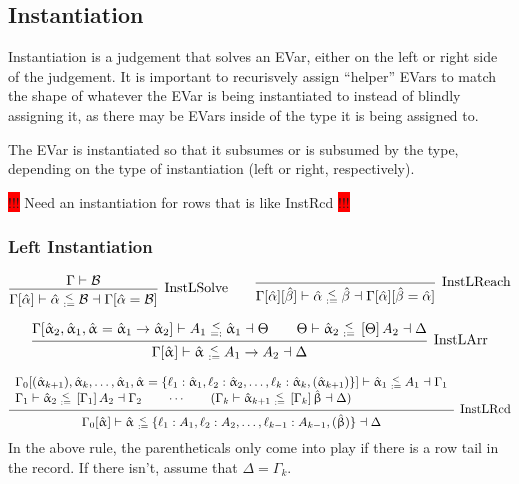 \documentclass{article}
\newcommand{\consider}[1]{\colorbox{red}{!!!} #1 \colorbox{red}{!!!}}
\newcommand{\spc}{\qquad}
\newcommand{\lbl}{\ell}
\newcommand{\ev}{\hat}
\newcommand{\evar}[1][]{\ev \upalpha_{#1}}
\newcommand{\evaralt}{\ev \upbeta}
\newcommand{\ctxinout}[3]{#1 \vdash #2 \dashv #3}
\newcommand{\subsume}{<:}
\newcommand{\subsumes}[4]{\ctxinout {#1} {#2 \subsume #3} {#4}}
\newcommand{\B}{\mathcal{B}}
\newcommand{\instLSymbol}{\;\substack{<\\:=}\;}
\newcommand{\instRSymbol}{\;\substack{<\\=:}\;}
\newcommand{\apply}[1]{\left[#1\right]}
\newcommand{\instL}[4]{#1 \vdash #2 \instLSymbol #3 \dashv #4}
\newcommand{\instR}[4]{#1 \vdash #2 \instRSymbol #3 \dashv #4}
\newcommand{\deduct}[3][]
{
  \begin{prooftree}
    \hypo{#2}
    \infer1[\text{#1}]{#3}
  \end{prooftree}
}
\begin{document}


\subsection{Instantiation}

Instantiation is a judgement that solves an EVar, either on the left or right
side of the judgement. It is important to recurisvely assign ``helper'' EVars to
match the shape of whatever the EVar is being instantiated to instead of blindly
assigning it, as there may be EVars inside of the type it is being assigned to.

The EVar is instantiated so that it subsumes or is subsumed by the type,
depending on the type of instantiation (left or right, respectively).

\consider{Need an instantiation for rows that is like InstRcd}

\subsubsection{Left Instantiation}

\[
  \deduct[InstLSolve]
  {\Gamma \vdash \B}
  {\instL{\Gamma[\ev\alpha]}{\ev \alpha}{\B}{\Gamma[\ev\alpha = \B]}}
  \spc
  \deduct[InstLReach]
  {}
  {\instL{\Gamma[\ev\alpha][\ev\beta]}{\ev \alpha}{\ev
      \beta}{\Gamma[\ev\alpha][\ev\beta = \ev\alpha]}}
\]

\[
  \deduct[InstLArr] {\instR{\Gamma[\evar[2], \evar[1], \evar = \evar[1] \to
      \evar[2]]}{A_1}{\evar[1]}{\Theta} \spc \instL{\Theta}{\evar[2]}{\apply \Theta
      A_2}{\Delta} } {\instL{\Gamma[\evar]}{\evar}{A_1 \to A_2}{\Delta}}
\]

\[
  \deduct[InstLRcd]
  {
    \begin{array}{l}
     \instL{\Gamma_0[(\evar[k+1]), \evar[k], \dots, \evar[1], \evar=\{\lbl_1 : \evar[1],
      \lbl_2 : \evar[2], \dots, \lbl_k : \evar[k], (\evar[k+1])\}]}{\evar[1]}{A_1}{\Gamma_1} \\
    \instL{\Gamma_1}{\evar[2]}{\apply{\Gamma_1} A_2}{\Gamma_2} \spc \cdots \spc
     (\instL{\Gamma_k}{\evar[k+1]}{\apply{\Gamma_k}\evaralt}{\Delta})
  \end{array}
  }
  {\instL{\Gamma_0[\evar]}{\evar}{\{\lbl_1:A_1, \lbl_2 : A_2, \dots, \lbl_{k-1} : A_{k-1}, (\evaralt)\}}{\Delta}}
\]
In the above rule, the parentheticals only come into play if there is a row tail
in the record. If there isn't, assume that \(\Delta = \Gamma_k\).
\end{document}
